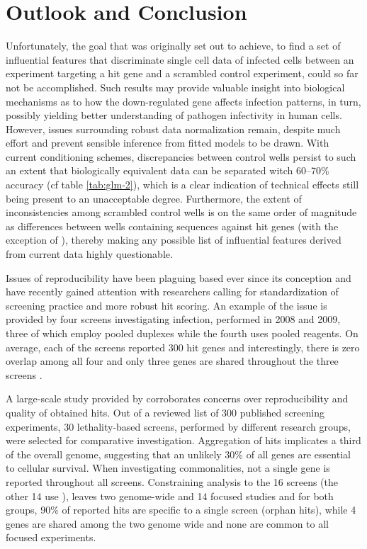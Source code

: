 \section{Outlook and Conclusion}
Unfortunately, the goal that was originally set out to achieve, to find a set of influential features that discriminate single cell data of infected cells between an  experiment targeting a hit gene and a scrambled control experiment, could so far not be accomplished. Such results may provide valuable insight into biological mechanisms as to how the down-regulated gene affects infection patterns, in turn, possibly yielding better understanding of pathogen infectivity in human cells. However, issues surrounding robust data normalization remain, despite much effort and prevent sensible inference from fitted models to be drawn. With current conditioning schemes, discrepancies between control wells persist to such an extent that biologically equivalent data can be separated witch 60--70\% accuracy (cf table \ref{tab:glm-2}), which is a clear indication of technical effects still being present to an unacceptable degree. Furthermore, the extent of inconsistencies among scrambled control wells is on the same order of magnitude as differences between wells containing  sequences against hit genes (with the exception of ), thereby making any possible list of influential features derived from current data highly questionable.

Issues of reproducibility have been plaguing  based  ever since its conception and have recently gained attention with researchers calling for standardization of screening practice and more robust hit scoring. An example of the issue is provided by four  screens investigating  infection, performed in 2008 and 2009, three of which employ pooled  duplexes while the fourth uses pooled  reagents. On average, each of the screens reported 300 hit genes and interestingly, there is zero overlap among all four and only three genes are shared throughout the three  screens \citep{Bhinder2014}.

A large-scale study provided by \citet{Bhinder2013} corroborates concerns over reproducibility and quality of obtained hits. Out of a reviewed list of 300 published screening experiments, 30 lethality-based screens, performed by different research groups, were selected for comparative investigation. Aggregation of hits implicates a third of the overall genome, suggesting that an unlikely 30\% of all genes are essential to cellular survival. When investigating commonalities, not a single gene is reported throughout all screens. Constraining analysis to the 16  screens (the other 14 use ), leaves two genome-wide and 14 focused studies and for both groups, 90\% of reported hits are specific to a single screen (orphan hits), while 4 genes are shared among the two genome wide and none are common to all focused experiments.

